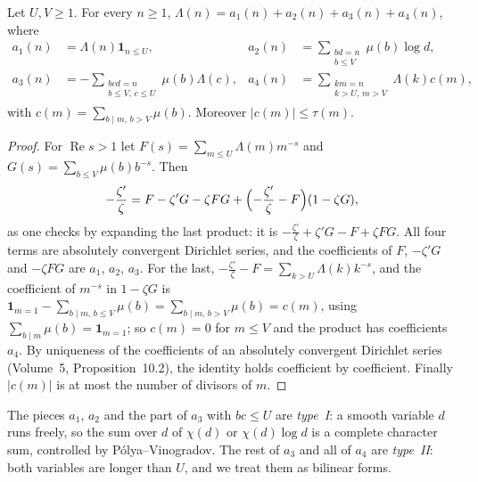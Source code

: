 \begin{lemma}[Vaughan, 1977]\label{lem:vaughan}
Let $U,V\ge1$. For every $n\ge1$, $\Lambda(n)=a_1(n)+a_2(n)+a_3(n)+a_4(n)$, where
\[
\begin{aligned}
a_1(n)&=\Lambda(n)\mathbf 1_{n\le U},& a_2(n)&=\sum_{\substack{bd=n\\b\le V}}\mu(b)\log d,\\
a_3(n)&=-\sum_{\substack{bcd=n\\b\le V,\,c\le U}}\mu(b)\Lambda(c),& a_4(n)&=\sum_{\substack{km=n\\k>U,\,m>V}}\Lambda(k)c(m),
\end{aligned}
\]
with $c(m)=\sum_{b\mid m,\,b>V}\mu(b)$. Moreover $|c(m)|\le\tau(m)$.
\end{lemma}
\begin{proof}
For $\operatorname{Re}s>1$ let $F(s)=\sum_{m\le U}\Lambda(m)m^{-s}$ and $G(s)=\sum_{b\le V}\mu(b)b^{-s}$. Then
\[
-\frac{\zeta'}\zeta=F-\zeta'G-\zeta FG+\Bigl(-\frac{\zeta'}\zeta-F\Bigr)(1-\zeta G),
\]
as one checks by expanding the last product: it is $-\frac{\zeta'}\zeta+\zeta'G-F+\zeta FG$. All four terms are absolutely convergent Dirichlet series, and the coefficients of $F$, $-\zeta'G$ and $-\zeta FG$ are $a_1$, $a_2$, $a_3$. For the last, $-\frac{\zeta'}\zeta-F=\sum_{k>U}\Lambda(k)k^{-s}$, and the coefficient of $m^{-s}$ in $1-\zeta G$ is $\mathbf 1_{m=1}-\sum_{b\mid m,\,b\le V}\mu(b)=\sum_{b\mid m,\,b>V}\mu(b)=c(m)$, using $\sum_{b\mid m}\mu(b)=\mathbf 1_{m=1}$; so $c(m)=0$ for $m\le V$ and the product has coefficients $a_4$. By uniqueness of the coefficients of an absolutely convergent Dirichlet series (Volume~5, Proposition~10.2), the identity holds coefficient by coefficient. Finally $|c(m)|$ is at most the number of divisors of $m$.
\end{proof}

The pieces $a_1$, $a_2$ and the part of $a_3$ with $bc\le U$ are \emph{type~I}: a smooth variable $d$ runs freely, so the sum over $d$ of $\chi(d)$ or $\chi(d)\log d$ is a complete character sum, controlled by Pólya--Vinogradov. The rest of $a_3$ and all of $a_4$ are \emph{type~II}: both variables are longer than $U$, and we treat them as bilinear forms.

